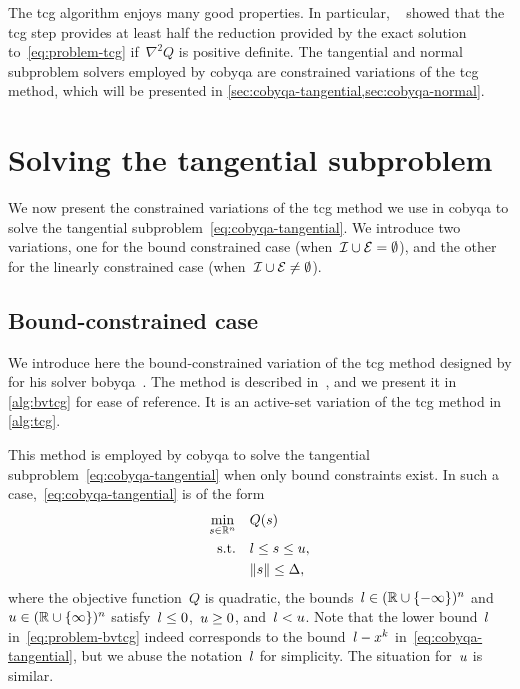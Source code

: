 The \gls{tcg} algorithm enjoys many good properties.
In particular, \citeauthor{Yuan_2000}~\cite{Yuan_2000} showed that the \gls{tcg} step provides at least half the reduction provided by the exact solution to~\cref{eq:problem-tcg} if~$\nabla^2 Q$ is positive definite.
The tangential and normal subproblem solvers employed by \gls{cobyqa} are constrained variations of the \gls{tcg} method,  which will be presented in \cref{sec:cobyqa-tangential,sec:cobyqa-normal}.

\section{Solving the tangential subproblem}
\label{sec:cobyqa-tangential}

We now present the constrained variations of the \gls{tcg} method we use in \gls{cobyqa} to solve the tangential subproblem~\cref{eq:cobyqa-tangential}.
We introduce two variations, one for the bound constrained case (when~$\mathcal{I} \cup \mathcal{E} = \emptyset$), and the other for the linearly constrained case (when~$\mathcal{I} \cup \mathcal{E} \neq \emptyset$).

\subsection{Bound-constrained case}

We introduce here the bound-constrained variation of the \gls{tcg} method designed by \citeauthor{Powell_2009} for his solver \gls{bobyqa}~\cite{Powell_2009}.
The method is described in~\cite[\S~3]{Powell_2009}, and we present it in \cref{alg:bvtcg} for ease of reference.
It is an active-set variation of the \gls{tcg} method in \cref{alg:tcg}.

This method is employed by \gls{cobyqa} to solve the tangential subproblem~\cref{eq:cobyqa-tangential} when only bound constraints exist.
In such a case,~\cref{eq:cobyqa-tangential} is of the form
\begin{subequations}
    \label{eq:problem-bvtcg}
    \begin{align}
        \min_{\sstep \in \R^n}  & \quad Q(\sstep) \label{eq:problem-bvtcg-obj}\\
        \text{s.t.}             & \quad \xl \le \sstep \le \xu,\\
                                & \quad \norm{\sstep} \le \rad,
    \end{align}
\end{subequations}
where the objective function~$Q$ is quadratic, the bounds~$l \in (\mathbb{R} \cup \{-\infty\})^n$ and~$u \in (\mathbb{R} \cup \{\infty\})^n$ satisfy~$l \le 0$,~$u \ge 0$, and~$l < u$.
Note that the lower bound~$l$ in~\cref{eq:problem-bvtcg} indeed corresponds to the bound~$\xl - \iter[k]$ in~\cref{eq:cobyqa-tangential}, but we abuse the notation~$l$ for simplicity.
The situation for~$u$ is similar.

